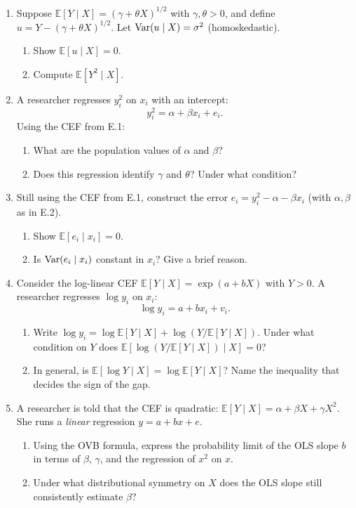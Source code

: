 \documentclass{article}
\newcommand{\E}{\mathbb{E}}
\begin{document}
\begin{enumerate}[label=\textbf{E.\arabic*},leftmargin=*,itemsep=10pt]

\item  Suppose $\E[Y \mid X] = (\gamma + \theta X)^{1/2}$ with $\gamma, \theta > 0$, and define $u = Y - (\gamma + \theta X)^{1/2}$.  Let $\mbox{Var}(u\mid X) = \sigma^2$ (homoskedastic).
\begin{enumerate}[label=(\alph*)]
  \item Show $\E[u \mid X] = 0$.
  \item Compute $\E[Y^2 \mid X]$.
\end{enumerate}

\item  A researcher regresses $y_i^2$ on $x_i$ with an intercept:
$$y_i^2 = \alpha + \beta x_i + e_i.$$
Using the CEF from E.1:
\begin{enumerate}[label=(\alph*)]
  \item What are the population values of $\alpha$ and $\beta$?
  \item Does this regression identify $\gamma$ and $\theta$?  Under what condition?
\end{enumerate}

\item  Still using the CEF from E.1, construct the error $e_i = y_i^2 - \alpha - \beta x_i$ (with $\alpha, \beta$ as in E.2).
\begin{enumerate}[label=(\alph*)]
  \item Show $\E[e_i \mid x_i] = 0$.
  \item Is $\mbox{Var}(e_i \mid x_i)$ constant in $x_i$?  Give a brief reason.
\end{enumerate}

\item  Consider the log-linear CEF $\E[Y \mid X] = \exp(a + bX)$ with $Y > 0$.  A researcher regresses $\log y_i$ on $x_i$:
$$\log y_i = a + b x_i + v_i.$$
\begin{enumerate}[label=(\alph*)]
  \item Write $\log y_i = \log\E[Y\mid X] + \log(Y/\E[Y\mid X])$.  Under what condition on $Y$ does $\E[\log(Y/\E[Y\mid X])\mid X] = 0$?
  \item In general, is $\E[\log Y \mid X] = \log\E[Y\mid X]$?  Name the inequality that decides the sign of the gap.
\end{enumerate}

\item  A researcher is told that the CEF is quadratic: $\E[Y\mid X] = \alpha + \beta X + \gamma X^2$.  She runs a \emph{linear} regression $y = a + bx + e$.
\begin{enumerate}[label=(\alph*)]
  \item Using the OVB formula, express the probability limit of the OLS slope $b$ in terms of $\beta$, $\gamma$, and the regression of $x^2$ on $x$.
  \item Under what distributional symmetry on $X$ does the OLS slope still consistently estimate $\beta$?
\end{enumerate}

\end{enumerate}
\end{document}
